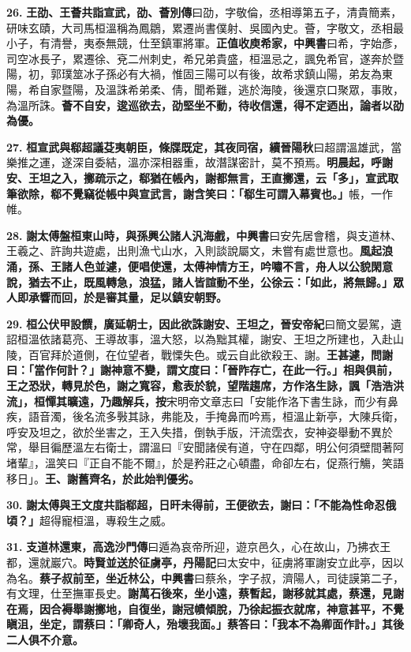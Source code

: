 \textbf{26.} \textbf{王劭、王薈共詣宣武，}{\footnotesize \textbf{劭、薈別傳}曰劭，字敬倫，丞相導第五子，清貴簡素，研味玄賾，大司馬桓溫稱為鳳鶵，累遷尚書僕射、吳國內史。薈，字敬文，丞相最小子，有清譽，夷泰無競，仕至鎮軍將軍。}\textbf{正值收庾希家，}{\footnotesize \textbf{中興書}曰希，字始彥，司空冰長子，累遷徐、兗二州刺史，希兄弟貴盛，桓溫忌之，諷免希官，遂奔於暨陽，初，郭璞筮冰子孫必有大禍，惟固三陽可以有後，故希求鎮山陽，弟友為東陽，希自家暨陽，及溫誅希弟柔、倩，聞希難，逃於海陵，後還京口聚眾，事敗，為溫所誅。}\textbf{薈不自安，逡巡欲去，劭堅坐不動，待收信還，得不定迺出，論者以劭為優。}

\textbf{27.} \textbf{桓宣武與郗超議芟夷朝臣，條牒既定，其夜同宿，}{\footnotesize \textbf{續晉陽秋}曰超謂溫雄武，當樂推之運，遂深自委結，溫亦深相器重，故潛謀密計，莫不預焉。}\textbf{明晨起，呼謝安、王坦之入，擲疏示之，郗猶在帳內，謝都無言，王直擲還，云「多」，宣武取筆欲除，郗不覺竊從帳中與宣武言，謝含笑曰：「郗生可謂入幕賓也。」}{\footnotesize 帳，一作帷。}

\textbf{28.} \textbf{謝太傅盤桓東山時，與孫興公諸人汎海戲，}{\footnotesize \textbf{中興書}曰安先居會稽，與支道林、王羲之、許詢共遊處，出則漁弋山水，入則談說屬文，未嘗有處世意也。}\textbf{風起浪涌，孫、王諸人色並遽，便唱使還，太傅神情方王，吟嘯不言，舟人以公貌閑意說，猶去不止，既風轉急，浪猛，諸人皆諠動不坐，公徐云：「如此，將無歸。」眾人即承響而回，於是審其量，足以鎮安朝野。}

\textbf{29.} \textbf{桓公伏甲設饌，廣延朝士，因此欲誅謝安、王坦之，}{\footnotesize \textbf{晉安帝紀}曰簡文晏駕，遺詔桓溫依諸葛亮、王導故事，溫大怒，以為黜其權，謝安、王坦之所建也，入赴山陵，百官拜於道側，在位望者，戰慄失色。或云自此欲殺王、謝。}\textbf{王甚遽，問謝曰：「當作何計？」謝神意不變，謂文度曰：「晉阼存亡，在此一行。」相與俱前，王之恐狀，轉見於色，謝之寬容，愈表於貌，望階趨席，方作洛生詠，諷「浩浩洪流」，桓憚其曠遠，乃趣解兵，}{\footnotesize \textbf{按}宋明帝文章志曰「安能作洛下書生詠，而少有鼻疾，語音濁，後名流多斅其詠，弗能及，手掩鼻而吟焉，桓溫止新亭，大陳兵衛，呼安及坦之，欲於坐害之，王入失措，倒執手版，汗流霑衣，安神姿舉動不異於常，舉目徧歷溫左右衛士，謂溫曰『安聞諸侯有道，守在四鄰，明公何須壁間著阿堵輩』，溫笑曰『正自不能不爾』，於是矜莊之心頓盡，命卻左右，促燕行觴，笑語移日」。}\textbf{王、謝舊齊名，於此始判優劣。}

\textbf{30.} \textbf{謝太傅與王文度共詣郗超，日旰未得前，王便欲去，謝曰：「不能為性命忍俄頃？」}{\footnotesize 超得寵桓溫，專殺生之威。}

\textbf{31.} \textbf{支道林還東，}{\footnotesize \textbf{高逸沙門傳}曰遁為哀帝所迎，遊京邑久，心在故山，乃拂衣王都，還就巖穴。}\textbf{時賢並送於征虜亭，}{\footnotesize \textbf{丹陽記}曰太安中，征虜將軍謝安立此亭，因以為名。}\textbf{蔡子叔前至，坐近林公，}{\footnotesize \textbf{中興書}曰蔡糸，字子叔，濟陽人，司徒謨第二子，有文理，仕至撫軍長史。}\textbf{謝萬石後來，坐小遠，蔡暫起，謝移就其處，蔡還，見謝在焉，因合褥舉謝擲地，自復坐，謝冠幘傾脫，乃徐起振衣就席，神意甚平，不覺瞋沮，坐定，謂蔡曰：「卿奇人，殆壞我面。」蔡答曰：「我本不為卿面作計。」其後二人俱不介意。}

